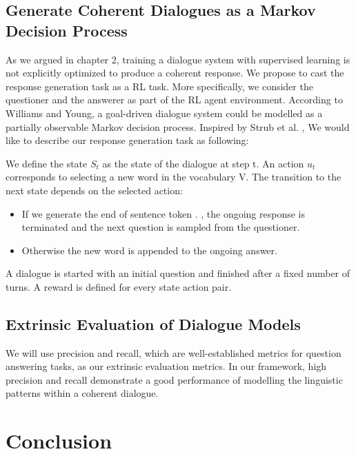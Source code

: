 \documentclass[bsc,frontabs,twoside,singlespacing,parskip,deptreport]{infthesis}     %
\begin{document}
\section{Generate Coherent Dialogues as a Markov Decision Process}
\noindent
As we argued in chapter 2, training a dialogue system with supervised learning is not explicitly optimized to produce a coherent response. We propose to cast the response generation task as a RL task. More specifically, we consider the questioner and the answerer as part of the RL agent environment. According to Williams and Young\cite{williams2007partially}, a goal-driven dialogue system could be modelled as a partially observable Markov decision process. Inspired by Strub et al. \cite{strub2017end}, We would like to describe our response generation task as following:

We define the state $S_t$ as the state of the dialogue at step t. An action $u_t$ corresponds to selecting a new word in the vocabulary V. The transition to the next state depends on the selected action:

\begin{itemize}
\item If we generate the end of sentence token . , the ongoing response is terminated and the next question is sampled from the questioner.
\item Otherwise the new word is appended to the ongoing answer.
\end{itemize}

A dialogue is started with an initial question and finished after a fixed number of turns. A reward is defined for every state action pair. 

\section{Extrinsic Evaluation of Dialogue Models}
\noindent

We will use precision and recall, which are well-established metrics for question answering tasks, as our extrinsic evaluation metrics. In our framework, high precision and recall demonstrate a good performance of modelling the linguistic patterns within a coherent dialogue.





\chapter{Conclusion}
\end{document}
